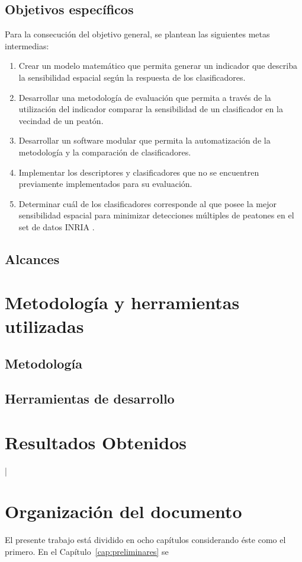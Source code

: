\subsection{Objetivos espec\'ificos}

Para la consecución del objetivo general, se plantean las siguientes metas intermedias:

\begin{enumerate}
  \item Crear un modelo matemático que permita generar un indicador que describa la sensibilidad espacial según la respuesta de los clasificadores.
\item Desarrollar una metodología de evaluación que permita a través de la utilización del indicador comparar la sensibilidad de un clasificador en la vecindad de un peatón.
\item Desarrollar un software modular que permita la automatización de la metodología y la comparación de clasificadores.
\item Implementar los descriptores y clasificadores que no se encuentren previamente implementados para su evaluación.
\item Determinar cuál de los clasificadores corresponde al que posee la mejor sensibilidad espacial para minimizar detecciones múltiples de peatones en el set de datos INRIA
.
\end{enumerate}

\subsection{Alcances}


\section{Metodolog\'ia y herramientas utilizadas}
\label{intro:metodologia}

\subsection{Metodolog\'ia}


\subsection{Herramientas de desarrollo}


\section{Resultados Obtenidos}|
\label{intro:resultados}


\section{Organizaci\'on del documento}
\label{intro:organizacion}

El presente trabajo está dividido en ocho capítulos considerando éste como el primero. En el Capítulo~\ref{cap:preliminares} se 
